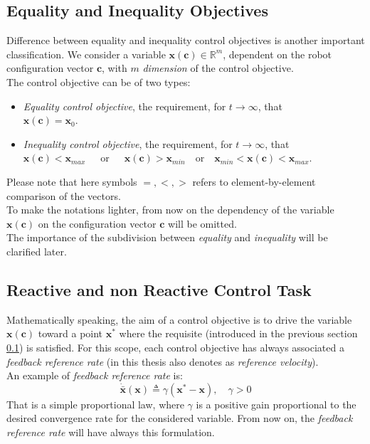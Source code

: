 \subsection{Equality and Inequality Objectives}
\label{sec:eqIneqObj}
Difference between equality and inequality control objectives is another important classification. We consider a variable  $ \boldsymbol{x}(\boldsymbol{c}) \in \mathbb{R}^m $, dependent on the robot configuration vector $ \boldsymbol{c}$, with $ m $ \textit{dimension} of the control objective. \\
The control objective can be of two types:
\begin{itemize}
	\item \textit{Equality control objective}, the requirement, for $t \to \infty$, that \\ \mbox{$\boldsymbol{x}(\boldsymbol{c}) = \boldsymbol{x}_0$}.
	
	\item \textit{Inequality control objective}, the requirement, for $t \to \infty$, that \\ \mbox{$\boldsymbol{x}(\boldsymbol{c}) < \boldsymbol{x}_{max}$ ~ or ~ $\boldsymbol{x}(\boldsymbol{c}) > \boldsymbol{x}_{min}$ ~or ~$ \boldsymbol{x}_{min} < \boldsymbol{x}(\boldsymbol{c}) < \boldsymbol{x}_{max}$}.
\end{itemize}
Please note that here symbols $= , < , >$ refers to element-by-element comparison of the vectors.\\
To make the notations lighter, from now on the dependency of the variable $\boldsymbol{x}(\boldsymbol{c})$ on the configuration vector $\boldsymbol{c}$ will be omitted.\\
The importance of the subdivision between \textit{equality} and \textit{inequality} will be clarified later.

\subsection{Reactive and non Reactive Control Task}
\label{sec:reactNonReact}
Mathematically speaking, the aim of a control objective is to drive the variable $\boldsymbol{x}(\boldsymbol{c})$ toward a point $ \boldsymbol{x}^* $ where the requisite (introduced in the previous section \ref{sec:eqIneqObj}) is satisfied.
For this scope, each control objective has always associated a \textit{feedback reference rate} (in this thesis also denotes as \textit{reference velocity}).\\
An example of \textit{feedback reference rate} is:
\begin{equation}
	\label{feedbackRate}
	\boldsymbol{\dot{{\bar{x}}}} (\boldsymbol{x}) \triangleq \gamma (\boldsymbol{x}^* - \boldsymbol{x}),\quad \gamma > 0
\end{equation}
That is a simple proportional law, where $\gamma$ is a positive gain proportional to the desired convergence rate for the considered variable. From now on, the \textit{feedback reference rate} will have always this formulation.\\

